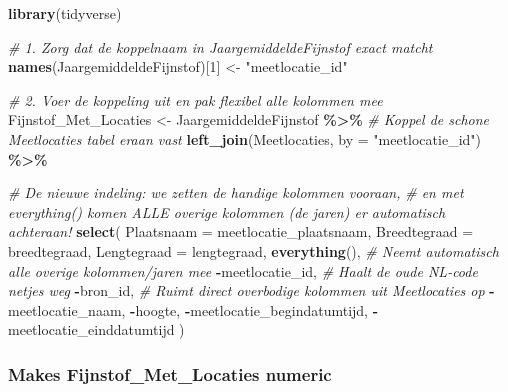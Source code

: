 \documentclass[
]{article}
\newenvironment{Shaded}{\begin{snugshade}}{\end{snugshade}}
\newcommand{\AttributeTok}[1]{\textcolor[rgb]{0.13,0.29,0.53}{#1}}
\newcommand{\CommentTok}[1]{\textcolor[rgb]{0.56,0.35,0.01}{\textit{#1}}}
\newcommand{\DecValTok}[1]{\textcolor[rgb]{0.00,0.00,0.81}{#1}}
\newcommand{\FunctionTok}[1]{\textcolor[rgb]{0.13,0.29,0.53}{\textbf{#1}}}
\newcommand{\NormalTok}[1]{#1}
\newcommand{\OtherTok}[1]{\textcolor[rgb]{0.56,0.35,0.01}{#1}}
\newcommand{\SpecialCharTok}[1]{\textcolor[rgb]{0.81,0.36,0.00}{\textbf{#1}}}
\newcommand{\StringTok}[1]{\textcolor[rgb]{0.31,0.60,0.02}{#1}}
\begin{document}
\begin{Shaded}
\begin{Highlighting}[]
\FunctionTok{library}\NormalTok{(tidyverse)}

\CommentTok{\# 1. Zorg dat de koppelnaam in JaargemiddeldeFijnstof exact matcht}
\FunctionTok{names}\NormalTok{(JaargemiddeldeFijnstof)[}\DecValTok{1}\NormalTok{] }\OtherTok{\textless{}{-}} \StringTok{"meetlocatie\_id"}

\CommentTok{\# 2. Voer de koppeling uit en pak flexibel alle kolommen mee}
\NormalTok{Fijnstof\_Met\_Locaties }\OtherTok{\textless{}{-}}\NormalTok{ JaargemiddeldeFijnstof }\SpecialCharTok{\%\textgreater{}\%}
  \CommentTok{\# Koppel de schone Meetlocaties tabel eraan vast}
  \FunctionTok{left\_join}\NormalTok{(Meetlocaties, }\AttributeTok{by =} \StringTok{"meetlocatie\_id"}\NormalTok{) }\SpecialCharTok{\%\textgreater{}\%}
  
  \CommentTok{\# De nieuwe indeling: we zetten de handige kolommen vooraan, }
  \CommentTok{\# en met \textquotesingle{}everything()\textquotesingle{} komen ALLE overige kolommen (de jaren) er automatisch achteraan!}
  \FunctionTok{select}\NormalTok{(}
    \AttributeTok{Plaatsnaam =}\NormalTok{ meetlocatie\_plaatsnaam,}
    \AttributeTok{Breedtegraad =}\NormalTok{ breedtegraad,}
    \AttributeTok{Lengtegraad =}\NormalTok{ lengtegraad,}
    \FunctionTok{everything}\NormalTok{(),          }\CommentTok{\# Neemt automatisch alle overige kolommen/jaren mee}
    \SpecialCharTok{{-}}\NormalTok{meetlocatie\_id,       }\CommentTok{\# Haalt de oude NL{-}code netjes weg}
    \SpecialCharTok{{-}}\NormalTok{bron\_id,              }\CommentTok{\# Ruimt direct overbodige kolommen uit Meetlocaties op}
    \SpecialCharTok{{-}}\NormalTok{meetlocatie\_naam,}
    \SpecialCharTok{{-}}\NormalTok{hoogte,}
    \SpecialCharTok{{-}}\NormalTok{meetlocatie\_begindatumtijd,}
    \SpecialCharTok{{-}}\NormalTok{meetlocatie\_einddatumtijd}
\NormalTok{  )}
\end{Highlighting}
\end{Shaded}

\subsubsection{Makes Fijnstof\_Met\_Locaties
numeric}\label{makes-fijnstof_met_locaties-numeric}
\end{document}
